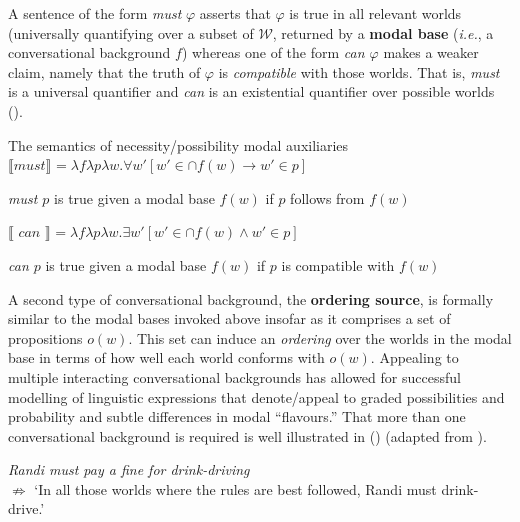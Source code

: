 \documentclass[12pt,dvipsnames]{report}
\providecommand{\denote}[2][]{\ensuremath{\llbracket{#2}\rrbracket^{#1}}}
\begin{document}
 A sentence of the form \textit{must} $ \varphi $ asserts that $ \varphi $ is true in all relevant worlds (universally quantifying over a subset of $ \mathcal W $, returned by a \textbf{modal base} (\textit{i.e.}, a conversational background $ f $) whereas one of the form \textit{can $ \varphi $} makes a weaker claim, namely that the truth of $ \varphi $ is \textit{compatible} with those worlds. That is, \textit{must} is a universal quantifier and \textit{can} is an existential quantifier over possible worlds (\nextx). %

\pex The semantics of necessity/possibility modal auxiliaries 
\a $ \denote{\textit{must}}=\lambda f\lambda p\lambda w.\forall w'[w'\in\cap f(w)\to w'\in p] $

\textit{must $ p $} is true given a modal base $ f(w) $ if $ p $ follows from $ f(w) $


\a $ \denote{\textit{~can~}}=\lambda f\lambda p\lambda w.\exists w'[w'\in\cap f(w)\wedge w'\in p] $

\textit{can $ p $} is true given a modal base $ f(w) $ if $ p $ is compatible with $ f(w) $

\xe

A second type of conversational background, the \textbf{ordering source}, is formally similar to the modal bases invoked above insofar as it comprises a set of propositions $ o(w) $. This set can induce an \textit{ordering} over the worlds in the modal base in terms of how well each world conforms with $ o(w) $. Appealing to multiple interacting conversational backgrounds has allowed for successful modelling of linguistic expressions that denote/appeal to graded possibilities and probability and subtle differences in modal ``flavours.'' That more than one conversational background is required is well illustrated in (\nextx) (adapted from \citealp*{Kaufmann2006}).

\pex \textit{Randi must pay a fine for drink-driving}\\ $ \boldsymbol{\not\Rightarrow }$ `In all those worlds where the rules are best followed, Randi must drink-drive.'\label{ex:randi}\xe
\end{document}
